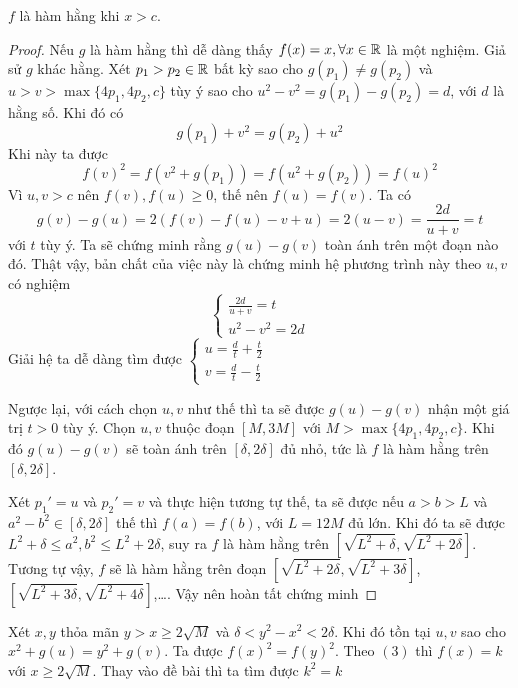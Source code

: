 \documentclass[11pt]{scrartcl}
\begin{document}
\begin{itemize}[label=, leftmargin=0em, itemsep=0.5em]
\begin{sol}
         $f$ là hàm hằng khi $x > c$.
        \begin{proof}
            Nếu $g$ là hàm hằng thì dễ dàng thấy $f(x) = x, \forall x\in \mathbb{R}$ là một nghiệm. Giả sử $g$ khác hằng. Xét $p_1 > p_2 \in \mathbb{R}$ bất kỳ sao cho $g(p_1) \neq g(p_2)$ và $u > v > \max\{4p_1,4p_2,c\}$ tùy ý sao cho $u^2 - v^2 = g(p_1) - g(p_2) = d$, với $d$ là hằng số. Khi đó có 
        \[
                g(p_1) + v^2 = g(p_2) + u^2
        \]
        Khi này ta được 
        \[
            f(v)^2 = f(v^2 + g(p_1)) = f(u^2 + g(p_2)) =f(u)^2 
        \]
        Vì $u,v > c$ nên $f(v), f(u) \geq 0$, thế nên $f(u) = f(v)$. Ta có 
        \[
        g(v) - g(u) = 2(f(v) - f(u) -v + u) = 2(u - v) = \frac{2d}{u + v} = t
        \]
        với $t$ tùy ý. Ta sẽ chứng minh rằng $g(u) - g(v)$ toàn ánh trên một đoạn nào đó. Thật vậy, bản chất của việc này là chứng minh hệ phương trình này theo $u,v$ có nghiệm
        \[
          \left\{
          \begin{array}{l}
          \frac{2d}{u + v} = t\\
          u^2 - v^2 = 2d
          \end{array}
          \right.
        \]
        Giải hệ ta dễ dàng tìm được \(
          \left\{
          \begin{array}{l}
          u = \frac{d}{t} + \frac{t}{2}\\
          v = \frac{d}{t} - \frac{t}{2}
          \end{array}
          \right.
        \)
         
        Ngược lại, với cách chọn $u,v$ như thế thì ta sẽ được $g(u) - g(v)$ nhận một giá trị $t > 0$ tùy ý. Chọn $u,v$ thuộc đoạn $[M,3M]$ với $M > \max\{4p_1,4p_2,c\}$. Khi đó $g(u) - g(v)$ sẽ toàn ánh trên $[\delta,2\delta]$ đủ nhỏ, tức là $f$ là hàm hằng trên $[\delta,2\delta]$. 

        Xét $p_1' = u$ và $p_2' = v$ và thực hiện tương tự thế, ta sẽ được nếu $a > b > L$ và $a^2 - b^2 \in [\delta,2\delta]$ thế thì $f(a) = f(b)$, với $L = 12M$ đủ lớn. Khi đó ta sẽ được $L^2 + \delta \leq a^2 ,b^2 \leq L^2 + 2\delta$, suy ra $f$ là hàm hằng trên $[\sqrt{L^2 +  \delta},\sqrt{L^2 + 2\delta}]$. Tương tự vậy, $f$ sẽ là hàm hằng trên đoạn $[\sqrt{L^2 +  2\delta},\sqrt{L^2 + 3\delta}]$, $[\sqrt{L^2 +  3\delta},\sqrt{L^2 + 4\delta}]$,\dots. Vậy nên hoàn tất chứng minh
        \end{proof}

        Xét $x,y$ thỏa mãn $y > x \geq 2\sqrt{M}$ và $\delta < y^2 -x^2 < 2\delta$. Khi đó tồn tại $u,v$ sao cho $x^2 + g(u) = y^2 + g(v)$. Ta được $f(x)^2 = f(y)^2$. Theo $(3)$ thì $f(x) = k$ với $x \geq 2\sqrt{M}$. Thay vào đề bài thì ta tìm được $k^2 = k$


\end{sol}
\end{itemize}
\end{document}
